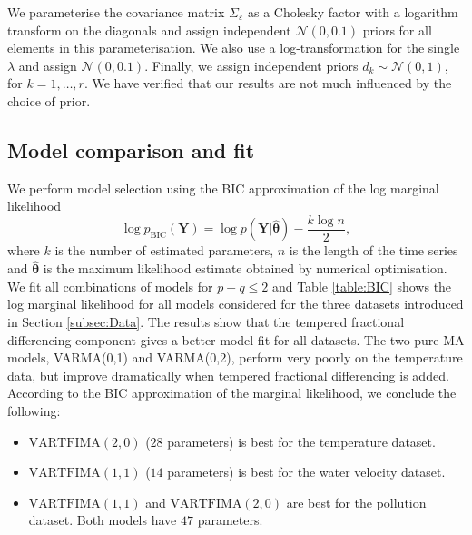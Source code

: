 \documentclass[11pt,english,oneside]{amsart}
\numberwithin{equation}{section}
\theoremstyle{plain}
\numberwithin{equation}{section}
\renewcommand{\v}[1]{\boldsymbol{#1}}
\begin{document}
We parameterise the covariance matrix $\Sigma_{\varepsilon}$ as a Cholesky factor with a logarithm transform on the diagonals and assign independent $\mathcal{N}(0,0.1)$ priors for all elements in this parameterisation. We also use a log-transformation for the single $\lambda$ and assign $\mathcal{N}(0,0.1)$. Finally, we assign independent priors $d_k \sim \mathcal{N}(0,1)$, for $k=1,\dots, r$. We have verified that our results are not much influenced by the choice of prior.

\subsection{Model comparison and fit}

We perform model selection using the BIC approximation of the log marginal likelihood \citep{kass1995bayes}
\begin{equation*}
    \log p_{\mathrm{BIC}}(\v Y) =  \log p(\v Y|\widehat{\v\theta}) - \frac{k \log n}{2}, 
\end{equation*}
where $k$ is the number of estimated parameters, $n$ is the length of the time series and $\widehat{\v\theta}$ is the maximum likelihood estimate obtained by numerical optimisation. We fit all combinations of models for $p+q \leq 2$ and Table \ref{table:BIC} shows the log marginal likelihood for all models considered for the three datasets introduced in Section \ref{subsec:Data}. The results show that the tempered fractional differencing component gives a better model fit for all datasets. The two pure MA models, VARMA(0,1) and VARMA(0,2), perform very poorly on the temperature data, but improve dramatically when tempered fractional differencing is added. According to the BIC approximation of the marginal likelihood, we conclude the following: 
\begin{itemize}
    \item $\mathrm{VARTFIMA}(2,0)$ ($28$ parameters) is best for the temperature dataset. 
    \item  $\mathrm{VARTFIMA}(1,1)$ ($14$ parameters) is best for the water velocity dataset.  
    \item  $\mathrm{VARTFIMA}(1,1)$ and $\mathrm{VARTFIMA}(2,0)$ are best for the pollution dataset. Both models have $47$ parameters.
\end{itemize}
\end{document}
